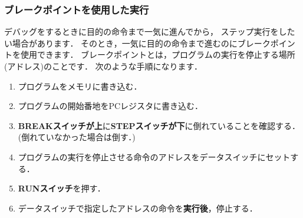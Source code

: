 \subsubsection{ブレークポイントを使用した実行}
デバッグをするときに目的の命令まで一気に進んでから，
ステップ実行をしたい場合があります．
そのとき，一気に目的の命令まで進むのにブレークポイントを使用できます．
ブレークポイントとは，プログラムの実行を停止する場所(アドレス)のことです．
次のような手順になります．

\begin{enumerate}
\item プログラムをメモリに書き込む．
\item プログラムの開始番地をPCレジスタに書き込む．
\item {\bf BREAKスイッチが上}に{\bf STEPスイッチが下}に倒れていることを確認する．\\
(倒れていなかった場合は倒す．)
\item プログラムの実行を停止させる命令のアドレスをデータスイッチにセットする．
\item {\bf RUNスイッチ}を押す．
\item データスイッチで指定したアドレスの命令を{\bf 実行後}，停止する．
\end{enumerate}

\begin{figure}[tb]
\end{figure}

